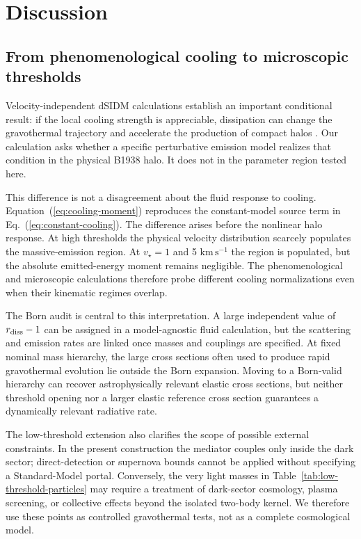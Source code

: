 \documentclass[12pt]{iopart}
\newcommand{\vstar}{v_\star}
\begin{document}
\section{Discussion}
\label{sec:discussion}

\subsection{From phenomenological cooling to microscopic thresholds}

Velocity-independent dSIDM calculations establish an important conditional
result: if the local cooling strength is appreciable, dissipation can change
the gravothermal trajectory and accelerate the production of compact halos
\citep{Schmidt2026}.  Our calculation asks whether a specific perturbative
emission model realizes that condition in the physical B1938 halo.  It does
not in the parameter region tested here.

This difference is not a disagreement about the fluid response to cooling.
Equation~(\ref{eq:cooling-moment}) reproduces the constant-model source term in
Eq.~(\ref{eq:constant-cooling}).  The difference arises before the nonlinear
halo response.  At high thresholds the physical velocity distribution scarcely
populates the massive-emission region.  At $\vstar=1$ and 5
$\mathrm{km\,s^{-1}}$ the region is populated, but the absolute emitted-energy
moment remains negligible.  The phenomenological and microscopic calculations
therefore probe different cooling normalizations even when their kinematic
regimes overlap.

The Born audit is central to this interpretation.  A large independent value
of $r_{\rm diss}-1$ can be assigned in a model-agnostic fluid calculation, but
the scattering and emission rates are linked once masses and couplings are
specified.  At fixed nominal mass hierarchy, the large cross sections often
used to produce rapid gravothermal evolution lie outside the Born expansion.
Moving to a Born-valid hierarchy can recover astrophysically relevant elastic
cross sections, but neither threshold opening nor a larger elastic reference
cross section guarantees a dynamically relevant radiative rate.

The low-threshold extension also clarifies the scope of possible external
constraints.  In the present construction the mediator couples only inside
the dark sector; direct-detection or supernova bounds cannot be applied without
specifying a Standard-Model portal.  Conversely, the very light masses in
Table~\ref{tab:low-threshold-particles} may require a treatment of dark-sector
cosmology, plasma screening, or collective effects beyond the isolated
two-body kernel.  We therefore use these points as controlled gravothermal
tests, not as a complete cosmological model.
\end{document}
